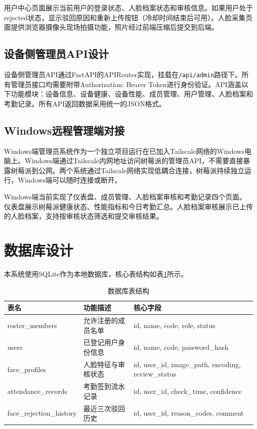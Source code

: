 用户中心页面展示当前用户的登录状态、人脸档案状态和审核信息。如果用户处于rejected状态，显示驳回原因和重新上传按钮（冷却时间结束后可用）。人脸采集页面提供浏览器摄像头现场拍摄功能，照片经过前端压缩后提交到后端。

\subsection{设备侧管理员API设计}

设备侧管理员API通过FastAPI的APIRouter实现，挂载在\texttt{/api/admin}路径下。所有管理员接口均需要附带Authorization: Bearer Token进行身份验证。API涵盖以下功能模块：设备信息、设备健康、设备性能、成员管理、用户管理、人脸档案和考勤记录。所有API返回数据采用统一的JSON格式。

\subsection{Windows远程管理端对接}

Windows端管理员系统作为一个独立项目运行在已加入Tailscale网络的Windows电脑上。Windows端通过Tailscale内网地址访问树莓派的管理员API，不需要直接暴露树莓派到公网。两个系统通过Tailscale网络实现低耦合连接，树莓派持续独立运行，Windows端可以随时连接或断开。

Windows端当前实现了仪表盘、成员管理、人脸档案审核和考勤记录四个页面。仪表盘展示树莓派健康状态、性能指标和今日考勤汇总。人脸档案审核展示已上传的人脸档案，支持按审核状态筛选和提交审核结果。

\section{数据库设计}

本系统使用SQLite作为本地数据库，核心表结构如表\ref{tab:db}所示。

\begin{table}[htbp]
    \centering
    \caption{数据库表结构}
    \label{tab:db}
    \begin{tabular}{p{2.5cm}p{6cm}p{2cm}}
        \toprule
        \textbf{表名} & \textbf{功能描述} & \textbf{核心字段} \\
        \midrule
        roster\_members & 允许注册的成员名单 & id, name, code, role, status \\
        users & 已登记用户身份信息 & id, name, code, password\_hash \\
        face\_profiles & 人脸特征与审核状态 & id, user\_id, image\_path, encoding, review\_status \\
        attendance\_records & 考勤签到流水记录 & id, user\_id, check\_time, confidence \\
        face\_rejection\_history & 最近三次驳回历史 & id, user\_id, reason\_codes, comment \\
        \bottomrule
    \end{tabular}
\end{table}

